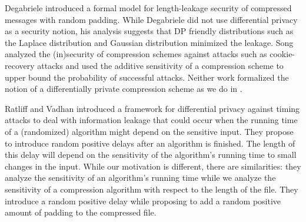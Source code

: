 Degabriele \cite{CCS:Degabriele21} introduced a formal model for length-leakage security of compressed messages with random padding. While Degabriele \cite{CCS:Degabriele21} did not use differential privacy as a security notion, his analysis suggests that DP friendly distributions such as the  Laplace distribution and Gaussian distribution minimized the leakage. Song \cite{song2024refined} analyzed the (in)security of compression schemes against attacks such as cookie-recovery attacks and used the additive sensitivity of a compression scheme to upper bound the probability of successful attacks. Neither work \cite{CCS:Degabriele21,song2024refined} formalized the notion of a differentially private compression scheme as we do in .  


Ratliff and Vadhan introduced a framework for differential privacy against timing attacks \cite{ratliff2024framework} to deal with information leakage that could occur when the running time of a (randomized) algorithm might depend on the sensitive input. They propose to introduce random positive delays after an algorithm is finished. The length of this delay will depend on the sensitivity of the algorithm's running time to small changes in the input. While our motivation is different, there are similarities: they analyze the sensitivity of an algorithm's running time while we analyze the sensitivity of a compression algorithm with respect to the length of the file. They introduce a random positive delay while proposing to add a random positive amount of padding to the compressed file. 



